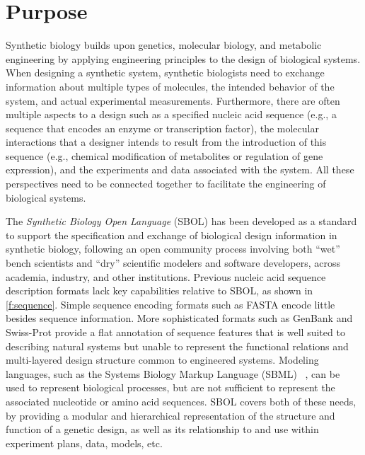\section{Purpose}

Synthetic biology builds upon genetics, molecular biology, and metabolic engineering by applying engineering principles to the design of biological systems.
When designing a synthetic system, synthetic biologists need to exchange information about multiple types of molecules, the intended behavior of the system, and actual experimental measurements.
Furthermore, there are often multiple aspects to a design such as a specified nucleic acid sequence (e.g., a sequence that encodes an enzyme or transcription factor), the molecular interactions that a designer intends to result from the introduction of this sequence (e.g., chemical modification of metabolites or regulation of gene expression), and the experiments and data associated with the system. All these perspectives need to be connected together to facilitate the engineering of biological systems.

The \emph{Synthetic Biology Open Language} (SBOL) has been developed as a standard to support the specification and exchange of biological design information in synthetic biology,
following an open community process involving both ``wet'' bench scientists and ``dry'' scientific modelers and software developers, across academia, industry, and other institutions.
Previous nucleic acid sequence description formats lack key capabilities relative to SBOL, as shown in \ref{f:sequence}.
Simple sequence encoding formats such as FASTA encode little besides sequence information.
More sophisticated formats such as GenBank and Swiss-Prot provide a flat annotation of sequence features that is well suited to describing natural systems but unable to represent the functional relations and multi-layered design structure common to engineered systems.
Modeling languages, such as the Systems Biology Markup Language (SBML) ~\cite{SBML}, can be used to represent biological processes, but are not sufficient to represent the associated nucleotide or amino acid sequences.
SBOL covers both of these needs, by providing a modular and hierarchical representation of the structure and function of a genetic design, as well as its relationship to and use within experiment plans, data, models, etc.

